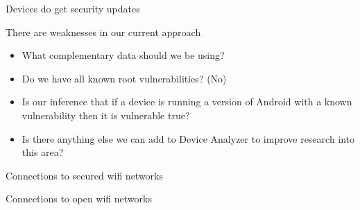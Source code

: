 \documentclass{beamer}
\begin{document}
\begin{frame}[plain]{Devices do get security updates}{}
 \begin{center}
  \vspace{-0.2em}
  \hspace{-2em}
 \end{center}
\end{frame}

\begin{frame}{There are weaknesses in our current approach}{}
 \begin{itemize}
  \item What complementary data should we be using?
  \item Do we have all known root vulnerabilities? (No)
  \item Is our inference that if a device is running a version of Android with a known vulnerability then it is vulnerable true?
  \item Is there anything else we can add to Device Analyzer to improve research into this area?
 \end{itemize}
\end{frame}

\begin{frame}[plain]{Connections to secured wifi networks}{}
 \begin{center}
  \vspace{-0.2em}
  \hspace{-3em}
 \end{center}
\end{frame}
\begin{frame}[plain]{Connections to open wifi networks}{}
 \begin{center}
  \vspace{-0.2em}
  \hspace{-3em}
 \end{center}
\end{frame}
\end{document}

